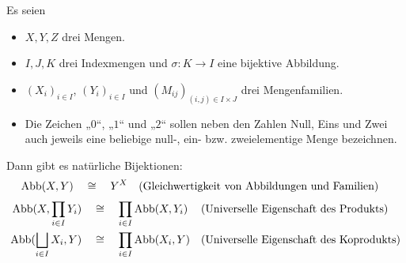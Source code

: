 Es seien
\begin{itemize}
    \item $X,Y,Z$ drei Mengen.
    \item $I,J,K$ drei Indexmengen und $\sigma : K\to I$ eine bijektive Abbildung.
    \item $(X_i)_{i\in I}$, $(Y_i)_{i\in I}$ und $(M_{ij})_{(i,j)\in I\times J}$ drei Mengenfamilien.
    \item Die Zeichen „$0$“, „$1$“ und „$2$“ sollen neben den Zahlen Null, Eins und Zwei auch jeweils eine beliebige null-, ein- bzw. zweielementige Menge bezeichnen.
\end{itemize}
Dann gibt es natürliche Bijektionen:
\begingroup
\allowdisplaybreaks
\begin{align*}
    \operatorname{Abb}(X,Y) & \quad\cong\quad Y^X && (\text{Gleichwertigkeit von Abbildungen und Familien})
\end{align*}
\begin{align*}
    \operatorname{Abb}(X,\prod_{i\in I} Y_i) & \quad\cong\quad \prod_{i\in I} \operatorname{Abb}(X,Y_i) && (\text{Universelle Eigenschaft des Produkts}) \\
    \operatorname{Abb}(\bigsqcup_{i\in I} X_i,Y) & \quad\cong\quad \prod_{i\in I} \operatorname{Abb}(X_i,Y) && (\text{Universelle Eigenschaft des Koprodukts})
\end{align*}
